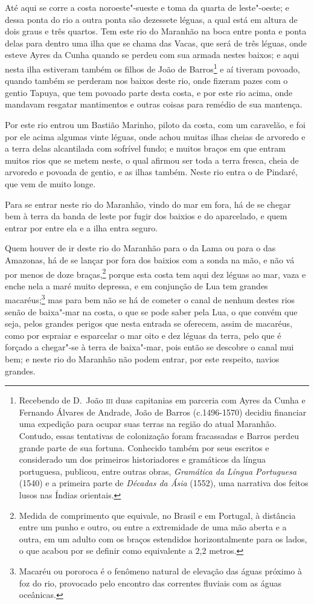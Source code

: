 \begin{linenumbers}
Até aqui se corre a costa noroeste"-sueste e toma da quarta de leste"-oeste; e dessa ponta
do rio a outra ponta são dezessete léguas, a qual está em altura de dois graus e três
quartos. Tem este rio do Maranhão na boca entre ponta e ponta delas para dentro uma ilha
que se chama das Vacas, que será de três léguas, onde esteve Ayres da Cunha quando se
perdeu com sua armada nestes baixos; e aqui nesta ilha estiveram também os filhos de João
de Barros\footnote{ Recebendo de D.~João \textsc{iii} duas capitanias em parceria com
Ayres da Cunha e Fernando Álvares de Andrade, João de Barros (c.1496-1570) decidiu
financiar uma expedição para ocupar suas terras na região do atual Maranhão. Contudo,
essas tentativas de colonização foram fracassadas e Barros perdeu grande parte de sua
fortuna. Conhecido também por seus escritos e considerado um dos primeiros historiadores e
gramáticos da língua portuguesa, publicou, entre outras obras, \textit{Gramática da Língua
Portuguesa} (1540) e a primeira parte de \textit{Décadas da Ásia} (1552), uma narrativa
dos feitos lusos nas Índias orientais.} e aí tiveram povoado, quando também se perderam
nos baixos deste rio, onde fizeram pazes com o gentio Tapuya, que tem povoado parte desta
costa, e por este rio acima, onde mandavam resgatar mantimentos e outras coisas para
remédio de sua mantença.

Por este rio entrou um Bastião Marinho, piloto da costa, com um caravelão, e foi por ele
acima algumas vinte léguas, onde achou muitas ilhas cheias de arvoredo e a terra delas
alcantilada com sofrível fundo; e muitos braços em que entram muitos rios que se metem
neste, o qual afirmou ser toda a terra fresca, cheia de arvoredo e povoada de gentio, e as
ilhas também. Neste rio entra o de Pindaré, que vem de muito longe.

Para se entrar neste rio do Maranhão, vindo do mar em fora, há de se chegar bem à terra da
banda de leste por fugir dos baixios e do aparcelado, e quem entrar por entre ela e a ilha
entra seguro.

Quem houver de ir deste rio do Maranhão para o da Lama ou para o das Amazonas, há de se
lançar por fora dos baixios com a sonda na mão, e não vá por menos de doze
braças,\footnote{ Medida de comprimento que equivale, no Brasil e em Portugal, à distância
entre um punho e outro, ou entre a extremidade de uma mão aberta e a outra, em um adulto
com os braços estendidos horizontalmente para os lados, o que acabou por se definir como
equivalente a 2,2 metros.} porque esta costa tem aqui dez léguas ao mar, vaza e enche
nela a maré muito depressa, e em conjunção de Lua tem grandes macaréus;\footnote{ Macaréu
ou pororoca é o fenômeno natural de elevação das águas próximo à foz do rio, provocado
pelo encontro das correntes fluviais com as águas oceânicas.} mas para bem não se há de
cometer o canal de nenhum destes rios senão de baixa"-mar na costa, o que se pode saber
pela Lua, o que convém que seja, pelos grandes perigos que nesta entrada se oferecem,
assim de macaréus, como por espraiar e esparcelar o mar oito e dez léguas da terra, pelo
que é forçado a chegar"-se à terra de baixa"-mar, pois então se descobre o canal mui bem; e
neste rio do Maranhão não podem entrar, por este respeito, navios grandes.


\end{linenumbers}
